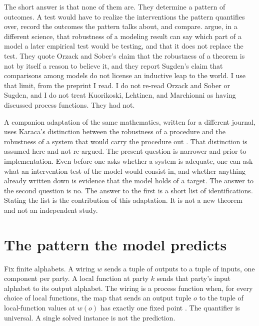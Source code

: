 \documentclass[11pt]{article}
\begin{document}
The short answer is that none of them are. They determine a pattern of outcomes. A test would have to realize the interventions the pattern quantifies over, record the outcomes the pattern talks about, and compare. \citet{kuorikoski2007} argue, in a different science, that robustness of a modeling result can say which part of a model a later empirical test would be testing, and that it does not replace the test. They quote Orzack and Sober's claim that the robustness of a theorem is not by itself a reason to believe it, and they report Sugden's claim that comparisons among models do not license an inductive leap to the world. I use that limit, from the preprint I read. I do not re-read Orzack and Sober or Sugden, and I do not treat Kuorikoski, Lehtinen, and Marchionni as having discussed process functions. They had not.

A companion adaptation of the same mathematics, written for a different journal, uses Karaca's distinction between the robustness of a procedure and the robustness of a system that would carry the procedure out \citep{karaca2022}. That distinction is assumed here and not re-argued. The present question is narrower and prior to implementation. Even before one asks whether a system is adequate, one can ask what an intervention test of the model would consist in, and whether anything already written down is evidence that the model holds of a target. The answer to the second question is no. The answer to the first is a short list of identifications. Stating the list is the contribution of this adaptation. It is not a new theorem and not an independent study.

\section{The pattern the model predicts}
\label{sec:pattern}

Fix finite alphabets. A wiring \(w\) sends a tuple of outputs to a tuple of inputs, one component per party. A local function at party \(k\) sends that party's input alphabet to its output alphabet. The wiring is a process function when, for every choice of local functions, the map that sends an output tuple \(o\) to the tuple of local-function values at \(w(o)\) has exactly one fixed point \citep{baumeler2016}. The quantifier is universal. A single solved instance is not the prediction.
\end{document}

